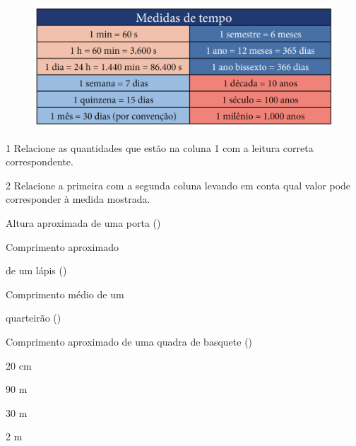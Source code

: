 \begin{figure}[htpb!]
\includegraphics[width=\textwidth]{../ilustracoes/MAT5/SAEB_5ANO_MAT_figura30_2.png}
\end{figure}


\num{1} Relacione as quantidades que estão na coluna 1 com a leitura correta correspondente.

\begin{multicols}{2}







\end{multicols}



\num{2} Relacione a primeira com a segunda coluna levando em conta qual
valor pode corresponder à medida mostrada.

\begin{multicols}{2}

\noindent{}Altura aproximada de uma porta ({})

\noindent{}Comprimento aproximado

\noindent{}de um lápis ({\rosa{20 cm}})

\noindent{}Comprimento médio de um

\noindent{} quarteirão ({})

\noindent{}Comprimento aproximado de uma quadra de basquete ({})

\columnbreak

20 cm
 
90 m

30 m
 
2 m
\end{multicols}

